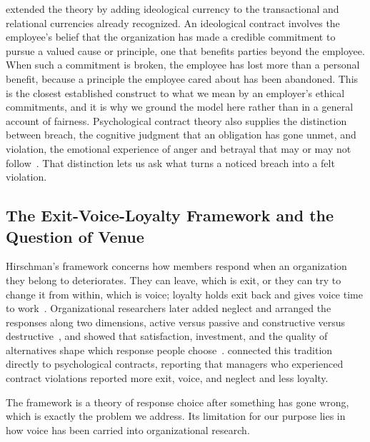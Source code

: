 \documentclass[12pt,a4paper]{article}
\theoremstyle{definition}
\begin{document}
\citet{thompson2003violations} extended the theory by adding ideological currency to the transactional and relational currencies already recognized. An ideological contract involves the employee's belief that the organization has made a credible commitment to pursue a valued cause or principle, one that benefits parties beyond the employee. When such a commitment is broken, the employee has lost more than a personal benefit, because a principle the employee cared about has been abandoned. This is the closest established construct to what we mean by an employer's ethical commitments, and it is why we ground the model here rather than in a general account of fairness. Psychological contract theory also supplies the distinction between breach, the cognitive judgment that an obligation has gone unmet, and violation, the emotional experience of anger and betrayal that may or may not follow~\citep{morrison1997employees}. That distinction lets us ask what turns a noticed breach into a felt violation.

\subsection{The Exit-Voice-Loyalty Framework and the Question of Venue}

Hirschman's framework concerns how members respond when an organization they belong to deteriorates. They can leave, which is exit, or they can try to change it from within, which is voice; loyalty holds exit back and gives voice time to work~\citep{hirschman1970exit}. Organizational researchers later added neglect and arranged the responses along two dimensions, active versus passive and constructive versus destructive~\citep{farrell1983exit}, and showed that satisfaction, investment, and the quality of alternatives shape which response people choose~\citep{rusbult1988impact}. \citet{turnley1999impact} connected this tradition directly to psychological contracts, reporting that managers who experienced contract violations reported more exit, voice, and neglect and less loyalty.

The framework is a theory of response choice after something has gone wrong, which is exactly the problem we address. Its limitation for our purpose lies in how voice has been carried into organizational research.
\end{document}
